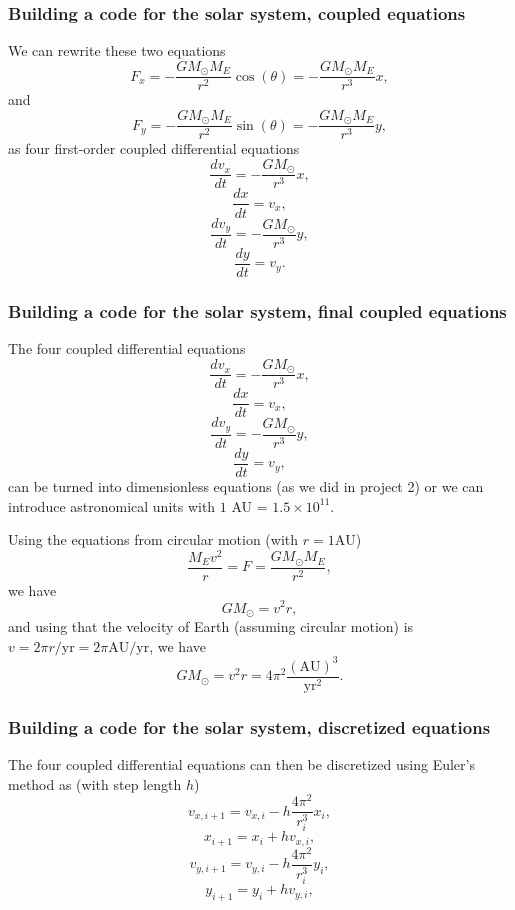 \documentclass{beamer}
\begin{document}
\begin{frame}
\frametitle{Building a code for the solar system, coupled equations}

\begin{block}{}
We can rewrite these two equations
  \[
   F_{x}=-\frac{GM_{\odot}M_E}{r^2}\cos{(\theta)}=-\frac{GM_{\odot}M_E}{r^3}x,
  \]
and
  \[
     F_{y}=-\frac{GM_{\odot}M_E}{r^2}\sin{(\theta)}=-\frac{GM_{\odot}M_E}{r^3}y,
  \]
as four first-order coupled differential equations
\[
   \frac{dv_x}{dt}=-\frac{GM_{\odot}}{r^3}x,
\]
\[
   \frac{dx}{dt}=v_x,
\]
\[
   \frac{dv_y}{dt}=-\frac{GM_{\odot}}{r^3}y,
\]
\[
   \frac{dy}{dt}=v_y.
\]
\end{block}
\end{frame}

\begin{frame}
\frametitle{Building a code for the solar system, final coupled equations}

\begin{block}{}
The four coupled differential equations
\[
   \frac{dv_x}{dt}=-\frac{GM_{\odot}}{r^3}x,
\]
\[
   \frac{dx}{dt}=v_x,
\]
\[
   \frac{dv_y}{dt}=-\frac{GM_{\odot}}{r^3}y,
\]
\[
   \frac{dy}{dt}=v_y,
\]
can be turned into dimensionless equations (as we did in project 2) or we can introduce astronomical units with $1$ AU = $1.5\times 10^{11}$. 

Using the equations from circular motion (with $r =1\mathrm{AU}$) 
\[
\frac{M_E v^2}{r} = F = \frac{GM_{\odot}M_E}{r^2},
\]
we have
\[
GM_{\odot}=v^2r,
\]
and using that the velocity of Earth (assuming circular motion) is
$v = 2\pi r/\mathrm{yr}=2\pi\mathrm{AU}/\mathrm{yr}$, we have
\[
GM_{\odot}= v^2r = 4\pi^2 \frac{(\mathrm{AU})^3}{\mathrm{yr}^2}.
\]
\end{block}
\end{frame}

\begin{frame}
\frametitle{Building a code for the solar system, discretized equations}

\begin{block}{}
The four coupled differential equations can then be discretized using Euler's method as (with step length $h$)
\[
   v_{x,i+1}=v_{x,i}-h\frac{4\pi^2}{r_i^3}x_i,
\]
\[
   x_{i+1}=x_i+hv_{x,i},
\]
\[
   v_{y,i+1}=v_{y,i}-h\frac{4\pi^2}{r_i^3}y_i,
\]
\[
   y_{i+1}=y_i+hv_{y,i},
\]

\end{block}
\end{frame}
\end{document}
